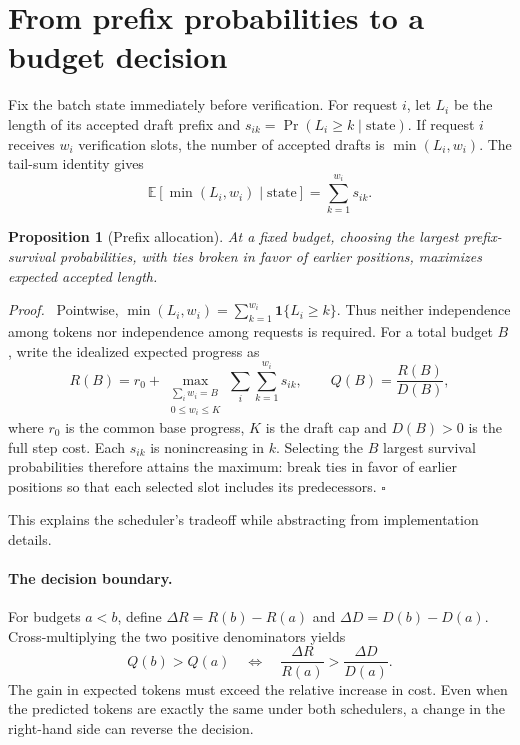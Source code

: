 \documentclass[11pt]{article}
\newtheorem{proposition}{Proposition}
\newenvironment{proof}{\par\noindent\textit{Proof.}\ }{\unskip\nobreak\hfill$\square$\par}
\begin{document}
\section{From prefix probabilities to a budget decision}
Fix the batch state immediately before verification. For request $i$, let $L_i$ be the length of its accepted draft prefix and $s_{ik}=\Pr(L_i\geq k\mid\text{state})$. If request $i$ receives $w_i$ verification slots, the number of accepted drafts is $\min(L_i,w_i)$. The tail-sum identity gives
\begin{equation}
 \mathbb E[\min(L_i,w_i)\mid\text{state}]
 =\sum_{k=1}^{w_i}s_{ik}.
 \label{eq:survival}
\end{equation}
\begin{proposition}[Prefix allocation] At a fixed budget, choosing the largest prefix-survival probabilities, with ties broken in favor of earlier positions, maximizes expected accepted length.\end{proposition}
\begin{proof} Pointwise, $\min(L_i,w_i)=\sum_{k=1}^{w_i}\mathbf 1\{L_i\geq k\}$. Thus neither independence among tokens nor independence among requests is required. For a total budget $B$, write the idealized expected progress as
\begin{equation}
 R(B)=r_0+\max_{\substack{\sum_i w_i=B\\0\le w_i\le K}}
                 \sum_i\sum_{k=1}^{w_i}s_{ik},
 \qquad Q(B)=\frac{R(B)}{D(B)} ,
\end{equation}
where $r_0$ is the common base progress, $K$ is the draft cap and $D(B)>0$ is the full step cost. Each $s_{ik}$ is nonincreasing in $k$. Selecting the $B$ largest survival probabilities therefore attains the maximum: break ties in favor of earlier positions so that each selected slot includes its predecessors. \end{proof} This explains the scheduler's tradeoff while abstracting from implementation details.

\paragraph{The decision boundary.} For budgets $a<b$, define $\Delta R=R(b)-R(a)$ and $\Delta D=D(b)-D(a)$. Cross-multiplying the two positive denominators yields
\begin{equation}
 Q(b)>Q(a)\quad\Longleftrightarrow\quad
 \frac{\Delta R}{R(a)}>\frac{\Delta D}{D(a)}.
 \label{eq:boundary}
\end{equation}
The gain in expected tokens must exceed the relative increase in cost. Even when the predicted tokens are exactly the same under both schedulers, a change in the right-hand side can reverse the decision.
\end{document}
